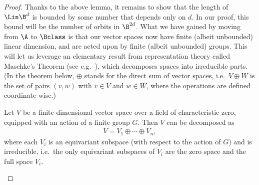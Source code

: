\begin{proof}
    Thanks to the above lemma, it remains to show that the length of $\Lin \B^d$ is bounded by some number that depends only on $d$. In our proof, this bound will be the number of orbits in $\B^{2d}$. What we have gained by moving from $\A$ to $\Bclass$ is that our vector spaces now have finite (albeit unbounded) linear dimension, and are acted upon by finite (albeit unbounded) groups. This will let us leverage an elementary result from representation theory called Maschke's Theorem (see e.g.~\cite[Ch.~8]{JamesLiebeck01}), which decomposes  spaces  into irreducible parts.  (In the theorem below, $\oplus$ stands for the direct sum of vector spaces, i.e.~$V \oplus W$ is the set of pairs $(v,w)$ with $v \in V$ and $w \in W$, where the operations are defined coordinate-wise.)

        \begin{fact}
          Let $V$ be a finite dimensional vector space over a field of characteristic zero, equipped with an action of a finite group $G$. Then $V$ can be decomposed as 
            \begin{align*}
            V = V_1 \oplus \cdots \oplus V_n,
            \end{align*}
            where each $V_i$ is an equivariant subspace (with respect to the action of $G$)  and  is  irreducible, i.e.~the only equivariant subspaces of $V_i$ are the zero space  and the full space $V_i$.
        \end{fact}



\end{proof}
